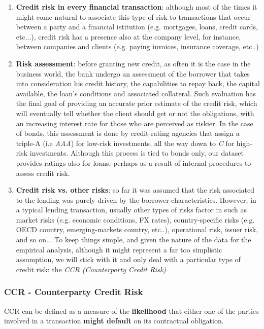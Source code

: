 \documentclass[a4paper,12pt]{article}
\begin{document}
        \begin{enumerate}
            \item \textbf{Credit risk in every financial transaction}: although most of the times it might come natural to associate this type of risk to transactions that occur between a party and a financial istitution (e.g. mortgages, loans, credit cards, etc...), credit risk has a presence also at the company level, for instance, between companies and clients (e.g. paying invoices, insurance coverage, etc..)  
            \item \textbf{Risk assessment}: before granting new credit, as often it is the case in the business world, the bank undergo an assessment of the borrower that takes into consideration his credit history, the capabilities to repay back, the capital available, the loan's conditions and associated collateral. Such evaluation has the final goal of providing an accurate prior estimate of the credit risk, which will eventually tell whether the client should get or not the obligations, with an increasing interest rate for those who are perceived as riskier. In the case of bonds, this assessment is done by credit-rating agencies that assign a triple-A (i.e \textit{AAA}) for low-risk investments, all the way down to \textit{C} for high-risk investments. Although this process is tied to bonds only, our dataset provides ratings also for loans, perhaps as a result of internal procedures to assess credit risk.
            \item \textbf{Credit risk vs. other risks}: so far it was assumed that the risk associated to the lending was purely driven by the borrower characteristics. However, in a typical lending transaction, usually other types of risks factor in such as market risks (e.g. economic conditions, FX rates), country-specific risks (e.g. OECD country, emerging-markets country, etc..), operational risk, issuer risk, and so on... To keep things simple, and given the nature of the data for the empirical analysis, although it might represent a far too simplistic assumption, we will stick with it and only deal with a particular type of credit risk: the \textit{CCR (Counterparty Credit Risk)}
        \end{enumerate}
        
    \subsubsection{CCR - Counterparty Credit Risk}
        \begin{definition}
            CCR can be defined as a measure of the \textbf{likelihood} that either one of the parties involved in a transaction \textbf{might default} on its contractual obligation.
        \end{definition}
\end{document}
